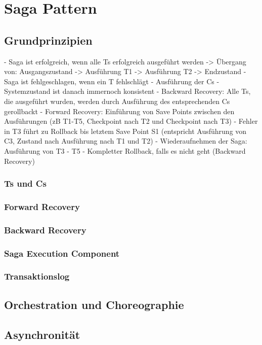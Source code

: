\chapter{Saga Pattern}

\section{Grundprinzipien}

- Saga ist erfolgreich, wenn alle Ts erfolgreich ausgeführt werden -> Übergang von: Ausgangszustand -> Ausführung T1 -> Ausführung T2 -> Endzustand
- Saga ist fehlgeschlagen, wenn ein T fehlschlägt
- Ausführung der Cs
- Systemzustand ist danach immernoch konsistent
- Backward Recovery: Alle Ts, die ausgeführt wurden, werden durch Ausführung des entsprechenden Cs gerollbackt
- Forward Recovery: Einführung von Save Points zwischen den Ausführungen (zB T1-T5, Checkpoint nach T2 und Checkpoint nach T3)
- Fehler in T3 führt zu Rollback bis letztem Save Point S1 (entspricht Ausführung von C3, Zustand nach Ausführung nach T1 und T2)
- Wiederaufnehmen der Saga: Ausführung von T3 - T5
- Kompletter Rollback, falls es nicht geht (Backward Recovery)

\subsection{Ts und Cs}

\subsection{Forward Recovery}

\subsection{Backward Recovery}

\subsection{Saga Execution Component}

\subsection{Transaktionslog}

\section{Orchestration und Choreographie}

\section{Asynchronität}